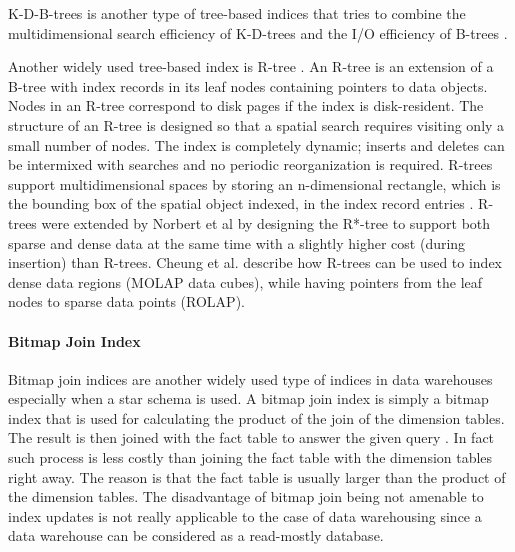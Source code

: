 \documentclass[12pt,a4paper]{article}
\begin{document}
K-D-B-trees \cite{robinson1981kdb} is another type of tree-based indices that tries to combine the multidimensional search efficiency of K-D-trees
\cite{bentley1975multidimensional} and the I/O efficiency of B-trees \cite{bayer1970organization}.

Another widely used tree-based index is R-tree \cite{guttman1984rtrees}. An R-tree is an extension of a B-tree with index records in its leaf nodes
containing pointers to data objects. Nodes in an R-tree correspond to disk pages if the index is disk-resident. The structure of an R-tree is designed so that a
spatial search requires visiting only a small number of nodes. The index is completely dynamic; inserts and deletes can be intermixed with searches and no
periodic reorganization is required. R-trees support multidimensional spaces by storing an n-dimensional rectangle, which is the bounding box of the spatial
object indexed, in the index record entries \cite{guttman1984rtrees}. R-trees were extended by Norbert et al \cite{norbert1990rstree} by designing the R*-tree
to support both sparse and dense data at the same time with a slightly higher cost (during insertion) than R-trees. Cheung et al. \cite{cheung2001towards}
describe how R-trees can be used to index dense data regions (MOLAP data cubes), while having pointers from the leaf nodes to sparse data points (ROLAP).

\paragraph{Bitmap Join Index}
Bitmap join indices are another widely used type of indices in data warehouses especially when a star schema is used. A bitmap join index is simply a bitmap
index that is used for calculating the product of the join of the dimension tables. The result is then joined with the fact table to answer the given query
\cite{oneil1995multi}. In fact such process is less costly than joining the fact table with the dimension tables right away. The reason is that the fact table
is usually larger than the product of the dimension tables. The disadvantage of bitmap join being not amenable to index updates is not really applicable to the
case of data warehousing since a data warehouse can be considered as a read-mostly database.
\end{document}
